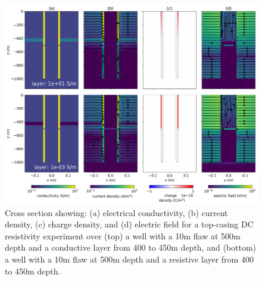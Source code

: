 \begin{figure}
    \begin{center}
    \includegraphics[width=\textwidth]{figures/integrity_layer_physics.png}
    \end{center}
\caption{
    Cross section showing: (a) electrical conductivity, (b) current density, (c) charge density,
    and (d) electric field for a top-casing DC resistivity experiment over (top) a well with a
    10m flaw at 500m depth and a conductive layer from 400 to 450m depth,
    and (bottom) a well with a 10m flaw at 500m depth and a resistive layer from 400 to 450m depth.
}
\label{fig:integrity_layer_physics}
\end{figure}
